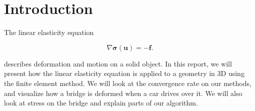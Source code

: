 \section{Introduction}



The linear elasticity equation

\begin{equation}
\label{eq:linEl}
\nabla \bm{\sigma}(\bm{u}) = - \bm{f}.
\end{equation}

describes deformation and motion on a solid object. In this report, we will present how the linear elasticity equation is applied to a geometry in 3D using the finite element method. We will look at the convergence rate on our methods, and visualize how a bridge is deformed when a car drives over it. We will also look at stress on the bridge and explain parts of our algorithm.